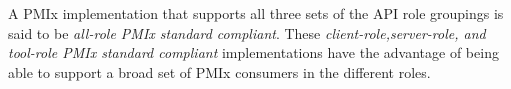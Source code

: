 A \ac{PMIx} implementation that supports all three sets of the \ac{API} role groupings is said to be \emph{all-role \ac{PMIx} standard compliant}.
These \emph{client-role,server-role, and tool-role \ac{PMIx} standard compliant} implementations have the advantage of being able to support a broad set of \ac{PMIx} consumers in the different roles.
\adviceimplend


